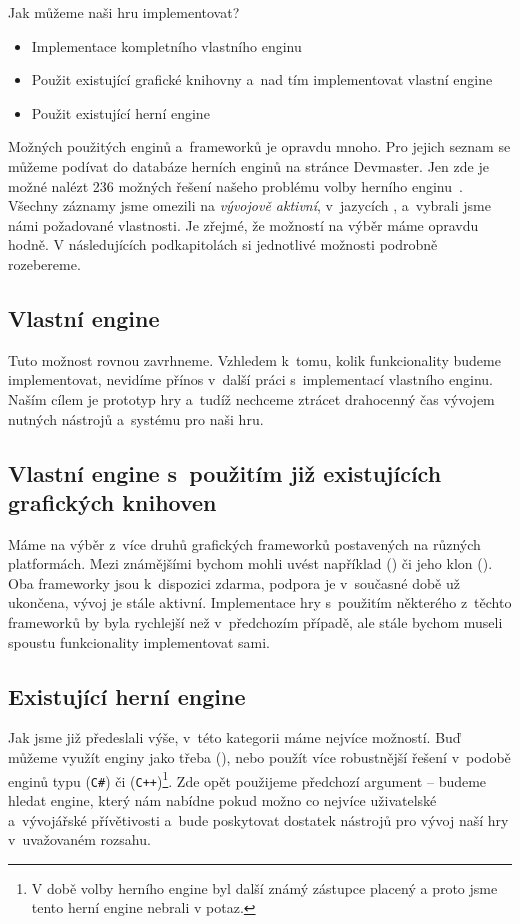 \pagebreak
Jak můžeme naši hru implementovat?
\begin{itemize}
	\item Implementace kompletního vlastního enginu
	\item Použit existující grafické knihovny a~nad tím implementovat vlastní engine
	\item Použit existující herní engine
\end{itemize}

Možných použitých enginů a~frameworků je opravdu mnoho. Pro jejich seznam se můžeme podívat do databáze herních enginů na stránce Devmaster. Jen zde je možné nalézt 236 možných řešení našeho problému volby herního enginu~\citep{engines_list}. Všechny záznamy jsme omezili na \textit{vývojově aktivní}, v~jazycích \CS{}, \CPP{} a~vybrali jsme námi požadované vlastnosti.
Je zřejmé, že možností na výběr máme opravdu hodně. V následujících podkapitolách si jednotlivé možnosti podrobně rozebereme.

\subsection{Vlastní engine}
Tuto možnost rovnou zavrhneme. Vzhledem k~tomu, kolik funkcionality budeme implementovat, nevidíme přínos v~další práci s~implementací vlastního enginu. Naším cílem je prototyp hry a~tudíž nechceme ztrácet drahocenný čas vývojem nutných nástrojů a~systému pro naši hru.


\subsection{Vlastní engine s~použitím již existujících grafických knihoven}
Máme na výběr z~více druhů grafických frameworků postavených na různých platformách. Mezi známějšími bychom mohli uvést například \XNA{} (\CS{}) či jeho klon \MG{} (\CS{}). Oba frameworky jsou k~dispozici zdarma, podpora \XNA{} je v~současné době už ukončena, vývoj \MG{} je stále aktivní. Implementace hry s~použitím některého z~těchto frameworků by byla rychlejší než v~předchozím případě, ale stále bychom museli spoustu funkcionality implementovat sami. 

\subsection{Existující herní engine}
Jak jsme již předeslali výše, v~této kategorii máme nejvíce možností. Buď můžeme využít enginy jako třeba \OG{} (\CPP{}), nebo použít více robustnější řešení v~podobě enginů typu \UN{} (\texttt{C\#}) či \UE{} (\texttt{C++})\footnote{V době volby herního engine byl další známý zástupce \CRY{} placený a proto jsme tento herní engine nebrali v potaz.}. Zde opět použijeme předchozí argument -- budeme hledat engine, který nám nabídne pokud možno co nejvíce uživatelské a~vývojářské přívětivosti a~bude poskytovat dostatek nástrojů pro vývoj naší hry v~uvažovaném rozsahu.

